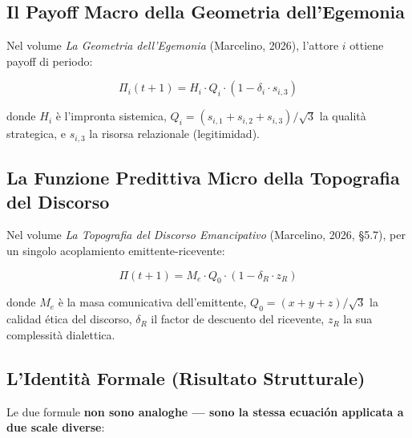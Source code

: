 \subsection{Il Payoff Macro della Geometria
dell'Egemonia}\label{il-payoff-macro-della-geometria-dellegemonia}

Nel volume \emph{La Geometria dell'Egemonia} (Marcelino, 2026), l'attore
\(i\) ottiene payoff di periodo:

\[
\Pi_i(t+1) = H_i \cdot Q_i \cdot (1 - \delta_i \cdot s_{i,3})
\]

donde \(H_i\) è l'impronta sistemica,
\(Q_i = (s_{i,1}+s_{i,2}+s_{i,3})/\sqrt{3}\) la qualità strategica, e
\(s_{i,3}\) la risorsa relazionale (legitimidad).

\subsection{La Funzione Predittiva Micro della Topografia del
Discorso}\label{la-funzione-predittiva-micro-della-topografia-del-discorso}

Nel volume \emph{La Topografia del Discorso Emancipativo} (Marcelino,
2026, \S{}5.7), per un singolo acoplamiento emittente-ricevente:

\[
\Pi(t+1) = M_e \cdot Q_0 \cdot (1 - \delta_R \cdot z_R)
\]

donde \(M_e\) è la masa comunicativa dell'emittente,
\(Q_0 = (x+y+z)/\sqrt{3}\) la calidad ética del discorso, \(\delta_R\)
il factor de descuento del ricevente, \(z_R\) la sua complessità
dialettica.

\subsection{\texorpdfstring{\Proved{} L'Identità Formale (Risultato
Strutturale)}{ L'Identità Formale (Risultato Strutturale)}}\label{lidentituxe0-formal-risultato-estructural}

Le due formule \textbf{non sono analoghe --- sono la stessa ecuación
applicata a due scale diverse}:

